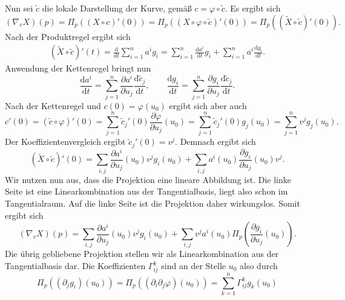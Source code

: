 Nun sei $\tilde c$ die lokale Darstellung der Kurve, gemäß
$c=\varphi\circ\tilde c$. Es ergibt sich
\begin{equation}
(\nabla_v X)(p) = \Pi_p((X\circ c)'(0))
= \Pi_p((X\circ\varphi\circ\tilde c)'(0))
= \Pi_p((\tilde X\circ\tilde c)'(0)).
\end{equation}
Nach der Produktregel ergibt sich
\begin{gather}
(\tilde X\circ\tilde c)'(t)
= \frac{\mathrm d}{\mathrm dt} \sum_{i=1}^n a^i g_i
= \sum_{i=1}^n \frac{\mathrm da^i}{\mathrm dt}g_i
+ \sum_{i=1}^n a^i\frac{\mathrm dg_i}{\mathrm dt}.
\end{gather}
Anwendung der Kettenregel bringt nun
\begin{equation}
\frac{\mathrm da^i}{\mathrm dt}
= \sum_{j=1}^n \frac{\partial a^i}{\partial u_j}
\frac{\mathrm d\tilde c_j}{\mathrm dt},\qquad
\frac{\mathrm dg_i}{\mathrm dt}
= \sum_{j=1}^n \frac{\partial g_i}{\partial u_j}
\frac{\mathrm d\tilde c_j}{\mathrm dt}.
\end{equation}
Nach der Kettenregel und $c(0)=\varphi(u_0)$ ergibt sich aber auch
\begin{equation}
c'(0) = (\tilde c\circ\varphi)'(0)
= \sum_{j=1}^n \tilde c_j'(0)\frac{\partial\varphi}{\partial u_j}(u_0)
= \sum_{j=1}^n \tilde c_j'(0)g_j(u_0)
= \sum_{j=1}^n v^j g_j(u_0).
\end{equation}
Der Koeffizientenvergleich ergibt $\tilde c_j'(0)=v^j$. Demnach ergibt sich
\begin{equation}
(\tilde X\circ\tilde c)'(0)
= \sum_{i,j} \frac{\partial a^i}{\partial u_j}(u_0) v^j g_i(u_0)
+ \sum_{i,j} a^i(u_0) \frac{\partial g_i}{\partial u_j}(u_0) v^j.
\end{equation}
Wir nutzen nun aus, dass die Projektion eine lineare Abbildung ist.
Die linke Seite ist eine Linearkombination aus der Tangentialbasis,
liegt also schon im Tangentialraum. Auf die linke Seite ist die
Projektion daher wirkungslos. Somit ergibt sich
\begin{equation}\label{eq:kov-Ableitung1}
(\nabla_v X)(p) = \sum_{i,j} \frac{\partial a^i}{\partial u_j}(u_0) v^j g_i(u_0)
+ \sum_{i,j} v^j a^i(u_0) \Pi_p(\frac{\partial g_i}{\partial u_j}(u_0)).
\end{equation}
Die übrig gebliebene Projektion stellen wir als Linearkombination
aus der Tangentialbasis dar. Die Koeffizienten $\Gamma_{ij}^k$
sind an der Stelle $u_0$ also durch%
\begin{equation}
\Pi_p((\partial_j g_i)(u_0))
= \Pi_p((\partial_i\partial_j\varphi)(u_0))
= \sum_{k=1}^n \Gamma_{ij}^k g_k(u_0)
\end{equation}
